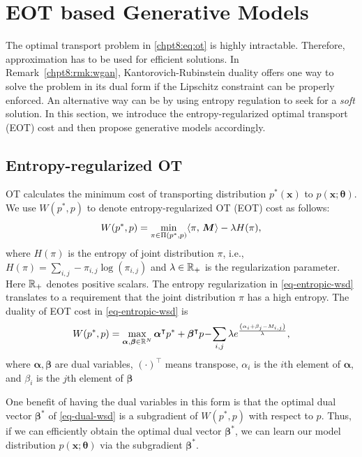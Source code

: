 \section{EOT based Generative Models}

The optimal transport problem in \eqref{chpt8:eq:ot} is highly intractable. Therefore, approximation has to be used for efficient solutions. In Remark~\ref{chpt8:rmk:wgan}, Kantorovich-Rubinstein duality offers one way to solve the problem in its dual form if the Lipschitz constraint can be properly enforced. An alternative way can be by using entropy regulation to seek for a \textit{soft} solution. In this section, we introduce the entropy-regularized optimal transport (EOT) cost and then propose generative models accordingly.

\subsection{Entropy-regularized OT} 

OT calculates the minimum cost of transporting distribution $p^{\ast}(\bm{x})$ to $p(\bm{x}; \bm{\theta})$. We use $W(p^{\ast},p)$ to denote entropy-regularized OT (EOT) cost as follows:
\begin{equation}\label{eq-entropic-wsd}
  W(p^{\ast},p)=\min_{ \pi \in \Pi(p^{\ast}, p)} \langle \pi,\,\bm{M}\rangle - \lambda H(\pi),
\end{equation}
where $H(\pi)$ is the entropy of joint distribution $\pi$, i.e., $H(\pi) = \sum_{i,j} -\pi_{i,j}
\log(\pi_{i,j})$ and $\lambda \in \mathbb{R}_{+}$ is the regularization
parameter. Here $\mathbb{R}_{+}$ denotes positive scalars. The entropy regularization in \eqref{eq-entropic-wsd}  translates 
to a requirement that the joint distribution $\pi$ has a high entropy. 
 The duality of EOT cost in \eqref{eq-entropic-wsd} is
\begin{equation}\label{eq-dual-wsd}
  W(p^{\ast}, p)  =  \max_{\bm{\al}, \bm{\be} \in \mathbb{R}^{N}} \bm{\al}^{\intercal}p^{\ast} + \bm{\beta}^{\intercal}p \! - \!
  \sum_{i,j} \lambda e^{ \frac{{\left( \al_i + \beta_j - M_{i,j} \right)}}{\la} },\vspace{-2pt}
\end{equation}
where $\bm{\alpha},\bm{\beta}$ are dual variables, $(\cdot)^{\intercal}$ means transpose, $\alpha_i$ is the $i$th element of $\bm{\alpha}$, and $\beta_i$ is the $j$th element of $\bm{\beta}$

One benefit of having the dual variables in this form is that the optimal dual vector $\bm{\beta}^{\ast}$
of \eqref{eq-dual-wsd} is a subgradient of $W(p^{\ast},p)$ with respect to $p$. Thus, if we can efficiently obtain the optimal dual vector $\bm{\beta}^{\ast}$, we can learn our model distribution $p(\bm{x}; \bm{\theta})$ via the subgradient $\bm{\beta}^{\ast}$.


